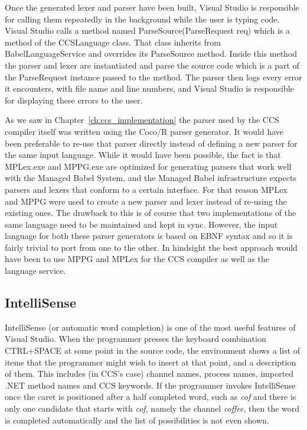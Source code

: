	Once the generated lexer and parser have been built, Visual Studio is 
	responsible for calling them repeatedly in the background while the user is 
	typing code. Visual Studio calls a method named 
	\textsf{ParseSource(ParseRequest req)} which is a method of the 
	\textsf{CCSLanguage} class. That class inherits from 
	\textsf{BabelLanguageService} and overrides its \textsf{ParseSource} 
	method. Inside this method the parser and lexer are instantiated and parse 
	the source code which is a part of the \textsf{ParseRequest} instance passed 
	to the method. The parser then logs every error it encounters, with file 
	name and line numbers, and Visual Studio is responsible for displaying these 
	errors to the user.

	As we saw in Chapter~\ref{ch:ccs_implementation} the parser used by the CCS 
	compiler itself was written using the Coco/R parser generator. It would have 
	been preferable to re-use that parser directly instead of defining a new 
	parser for the same input language. While it would have been possible, the 
	fact is that MPLex.exe and MPPG.exe are optimized for generating parsers 
	that work well with the Managed Babel System, and the Managed Babel 
	infrastructure expects parsers and lexers that conform to a certain 
	interface. For that reason MPLex and MPPG were used to create a new parser 
	and lexer instead of re-using the existing ones. The drawback to this is of 
	course that two implementations of the same language need to be maintained 
	and kept in sync. However, the input language for both these parser 
	generators is based on EBNF syntax and so it is fairly trivial to port from 
	one to the other. In hindsight the best approach would have been to use MPPG 
	and MPLex for the CCS compiler as well as the language service.
	
	\subsection{IntelliSense}
	IntelliSense (or automatic word completion) is one of the most useful 
	features of Visual Studio. When the programmer presses the keyboard 
	combination CTRL+SPACE at some point in the source code, the environment 
	shows a list of items that the programmer might wish to insert at that 
	point, and a description of them. This includes (in CCS's case) channel 
	names, process names, imported .NET method names and CCS keywords. If the 
	programmer invokes IntelliSense once the caret is positioned after a half 
	completed word, such as \textit{cof} and there is only one candidate that 
	starts with \textit{cof}, namely the channel \textit{coffee}, then the word 
	is completed automatically and the list of possibilities is not even shown.
	
